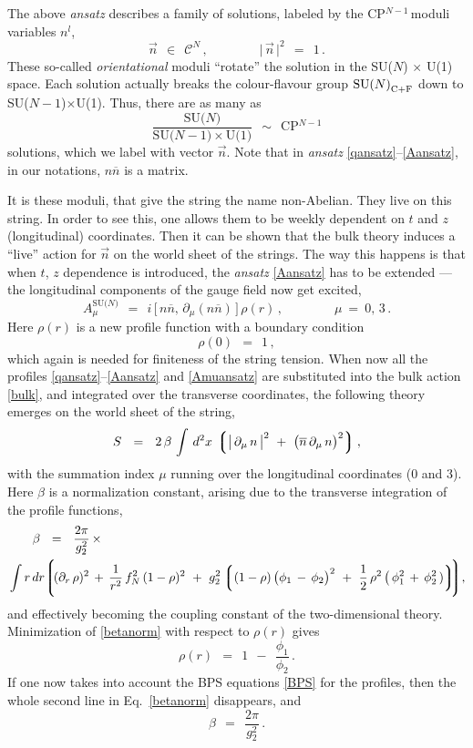 \documentclass[12pt]{article}
\def\beq{\begin{equation}}
\def\eeq{\end{equation}}
\newcommand{\p}{\partial}
\newcommand{\ov}{\overline}
\newcommand{\mc}[1]{\mathcal{#1}}
\newcommand{\lgr}{\left\lgroup}
\newcommand{\rgr}{\right\rgroup}
\newcommand{\sunu}{{\rm SU($N$) $\times$ U(1) }}
\def\cfl {$\text{SU($N$)}_{\rm C+F}$ }
\newcommand{\nbar}{\ov{n}}
\newcommand{\nnbar}{n\ov{n}}
\newcommand{\cpn}{CP$^{N-1}$\,}
\newcommand{\ansatz}{{\it ansatz} }
\begin{document}
	The above \ansatz describes a family of solutions, labeled by the \cpn moduli variables $n^l$,
\beq
	\vec{n}    ~~\in~~    \mc{C}^N\,,
	\qquad\qquad
	\big|\, \vec{n} \,\big|^2    ~~=~~    1\,.
\eeq
	These so-called {\it orientational} moduli ``rotate'' the solution in the \sunu space.
	Each solution actually breaks the colour-flavour group \cfl down to SU($N-1$)$\times$U(1).
	Thus, there are as many as
\beq
	\frac{\text{SU($N$)}}{\text{SU($N-1$)$\times$U(1)}}    ~~\sim~~    \text{CP$^{N-1}$}
\eeq
	solutions, which we label with vector $ \vec{n} $.
	Note that in \ansatz \eqref{qansatz}--\eqref{Aansatz}, in our notations, $ \nnbar $ is a matrix.

	It is these moduli, that give the string the name non-Abelian.
	They live on this string.
	In order to see this, one allows them to be weekly
	dependent on $ t $ and $ z $ (longitudinal) coordinates.
	Then it can be shown \cite{SYrev} that the bulk theory induces a ``live'' action for $ \vec{n} $
	on the world sheet of the strings.
	The way this happens is that when $ t $, $ z $ dependence is introduced, 
	the \ansatz \eqref{Aansatz} has to be extended --- 
	the longitudinal components of the gauge field now get excited,
\beq
\label{Amuansatz}
	A_\mu^\text{SU($N$)}    ~~=~~    i\, \big[\, \nnbar,\, \p_\mu(\nnbar) \,\big]\, \rho(r)\,,
	\qquad\qquad
	\mu ~=~ 0,\, 3\,.
\eeq
	Here $ \rho(r) $ is a new profile function with a boundary condition
\beq
	\rho(0)    ~~=~~    1\,,
\eeq
	which again is needed for finiteness of the string tension.
	When now all the profiles \eqref{qansatz}--\eqref{Aansatz} and \eqref{Amuansatz} are substituted into the
	bulk action \eqref{bulk}, and integrated over the transverse coordinates, the following theory emerges on the
	world sheet of the string,
\beq
\label{ws}
	S    ~~=~~    2\,\beta\, \int\, d^2x\, \lgr \big|\, \p_\mu\, n \,\big|^2  
					~+~  \big( \nbar\, \p_\mu\, n \big)^2 \rgr,
\eeq
	with the summation index $ \mu $ running over the longitudinal coordinates (0 and 3).
	Here $ \beta $ is a normalization constant, arising due to the transverse integration of the profile functions,
\begin{align}
%
\label{betanorm}
	&
	\qquad
	\beta    ~~=~~    	\frac{2\pi}{g_2^2}\, \times
	\\
%
\notag
	&
	\int r\, dr
		\Biggl\lgroup\!  (\p_r\, \rho)^2 \,+\, \frac{1}{r^2}\, f_N^2\, (1-\rho)^2 
			~+~  g_2^2 \lgr (1-\rho)\, \big( \phi_1 \,-\, \phi_2 \big)^2  ~+~
				\frac{1}{2}\, \rho^2\, \big(\, \phi_1^2 \,+\, \phi_2^2 \,) \rgr \!
		\!\Biggr\rgroup,
\end{align}
	and effectively becoming the coupling constant of the two-dimensional theory.
	Minimization of \eqref{betanorm} with respect to $ \rho(r) $ gives
\beq
	\rho(r)    ~~=~~    1  ~~-~~ \frac{\phi_1}{\phi_2}\,.
\eeq
	If one now takes into account the BPS equations \eqref{BPS} for the profiles, then the whole
	second line in Eq.~\eqref{betanorm} disappears, and
\beq
	\beta    ~~=~~    \frac{2\pi}{g_2^2}\,.
\eeq
	
\end{document}
